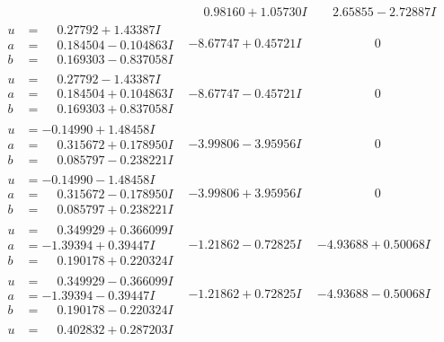 \documentclass[1p]{elsarticle_modified}
\theoremstyle{definition}
\begin{document}
$$\begin{array}{c|c|c}
 & \phantom{-}0.98160 + 1.05730 I & \phantom{-}2.65855 - 2.72887 I \\ \hline\begin{aligned}
u &= \phantom{-}0.27792 + 1.43387 I \\
a &= \phantom{-}0.184504 - 0.104863 I \\
b &= \phantom{-}0.169303 - 0.837058 I\end{aligned}
 & -8.67747 + 0.45721 I & \phantom{-0.000000 } 0 \\ \hline\begin{aligned}
u &= \phantom{-}0.27792 - 1.43387 I \\
a &= \phantom{-}0.184504 + 0.104863 I \\
b &= \phantom{-}0.169303 + 0.837058 I\end{aligned}
 & -8.67747 - 0.45721 I & \phantom{-0.000000 } 0 \\ \hline\begin{aligned}
u &= -0.14990 + 1.48458 I \\
a &= \phantom{-}0.315672 + 0.178950 I \\
b &= \phantom{-}0.085797 - 0.238221 I\end{aligned}
 & -3.99806 - 3.95956 I & \phantom{-0.000000 } 0 \\ \hline\begin{aligned}
u &= -0.14990 - 1.48458 I \\
a &= \phantom{-}0.315672 - 0.178950 I \\
b &= \phantom{-}0.085797 + 0.238221 I\end{aligned}
 & -3.99806 + 3.95956 I & \phantom{-0.000000 } 0 \\ \hline\begin{aligned}
u &= \phantom{-}0.349929 + 0.366099 I \\
a &= -1.39394 + 0.39447 I \\
b &= \phantom{-}0.190178 + 0.220324 I\end{aligned}
 & -1.21862 - 0.72825 I & -4.93688 + 0.50068 I \\ \hline\begin{aligned}
u &= \phantom{-}0.349929 - 0.366099 I \\
a &= -1.39394 - 0.39447 I \\
b &= \phantom{-}0.190178 - 0.220324 I\end{aligned}
 & -1.21862 + 0.72825 I & -4.93688 - 0.50068 I \\ \hline\begin{aligned}
u &= \phantom{-}0.402832 + 0.287203 I \\

\end{aligned}
\end{array}$$
\end{document}
